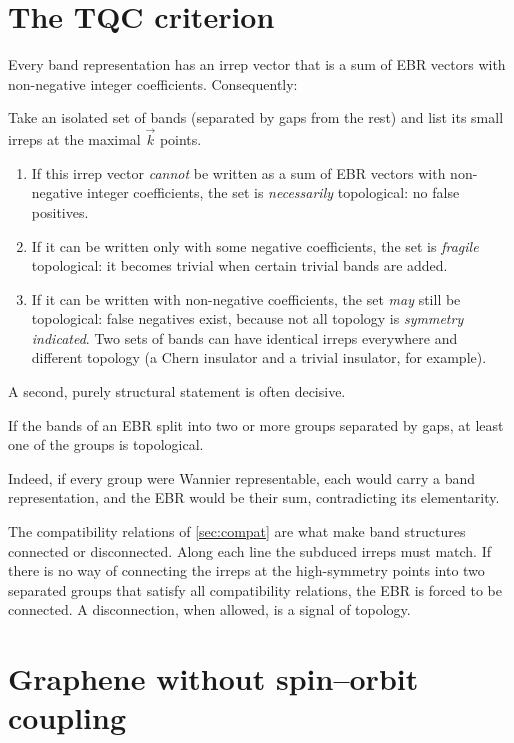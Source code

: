 \section{The TQC criterion}\label{sec:tqc}

Every band representation has an irrep vector that is a sum of EBR vectors with
non-negative integer coefficients. Consequently:
\begin{keyresult}
Take an isolated set of bands (separated by gaps from the rest) and list its small
irreps at the maximal $\vec{k}$ points.
\begin{enumerate}
\item If this irrep vector \emph{cannot} be written as a sum of EBR vectors with
      non-negative integer coefficients, the set is \emph{necessarily} topological:
      no false positives.
\item If it can be written only with some negative coefficients, the set is
      \emph{fragile} topological: it becomes trivial when certain trivial bands are
      added.
\item If it can be written with non-negative coefficients, the set \emph{may} still
      be topological: false negatives exist, because not all topology is
      \emph{symmetry indicated}. Two sets of bands can have identical irreps
      everywhere and different topology (a Chern insulator and a trivial insulator,
      for example).
\end{enumerate}
\end{keyresult}
A second, purely structural statement is often decisive.
\begin{theorem}
If the bands of an EBR split into two or more groups separated by gaps, at least one
of the groups is topological.
\end{theorem}
Indeed, if every group were Wannier representable, each would carry a band
representation, and the EBR would be their sum, contradicting its elementarity.

The compatibility relations of \cref{sec:compat} are what make band structures
connected or disconnected. Along each line the subduced irreps must match. If there is
no way of connecting the irreps at the high-symmetry points into two separated groups
that satisfy all compatibility relations, the EBR is forced to be connected. A
disconnection, when allowed, is a signal of topology.

\section{Graphene without spin--orbit coupling}

